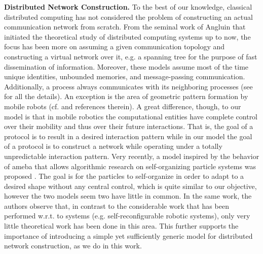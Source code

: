 \documentclass[oribibl, 11pt]{llncs}
\begin{document}
\noindent\textbf{Distributed Network Construction.} To the best of our knowledge, classical distributed computing has not considered the problem of constructing an actual communication network from scratch. From the seminal work of Angluin \cite{An80} that initiated the theoretical study of distributed computing systems up to now, the focus has been more on assuming a given communication topology and constructing a virtual network over it, e.g. a spanning tree for the purpose of fast dissemination of information. Moreover, these models assume most of the time unique identities, unbounded memories, and message-passing communication. Additionally, a process always communicates with its neighboring processes (see \cite{Ly96} for all the details). An exception is the area of geometric pattern formation by mobile robots (cf. \cite{SY99,DFSY10} and references therein). A great difference, though, to our model is that in mobile robotics the computational entities have complete control over their mobility and thus over their future interactions. That is, the goal of a protocol is to result in a desired interaction pattern while in our model the goal of a protocol is to construct a network while operating under a totally unpredictable interaction pattern. Very recently, a model inspired by the behavior of ameba that allows algorithmic research on self-organizing particle systems was proposed \cite{DGRS13}. The goal is for the particles to self-organize in order to adapt to a desired shape without any central control, which is quite similar to our objective, however the two models seem two have little in common. In the same work, the authors observe that, in contrast to the considerable work that has been performed w.r.t. to systems (e.g. self-reconfigurable robotic systems), only very little theoretical work has been done in this area. This further supports the importance of introducing a simple yet sufficiently generic model for distributed network construction, as we do in this work.\\
\end{document}
